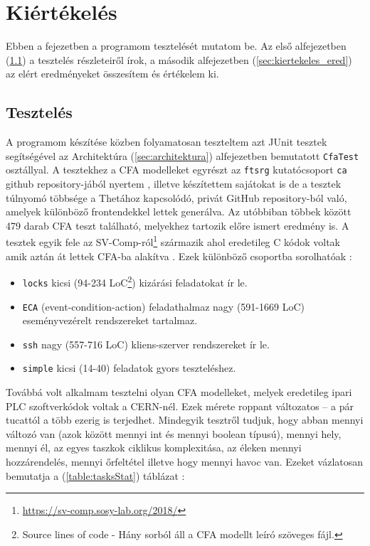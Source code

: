 \chapter{Kiértékelés}
\label{sec:kiertekeles}

Ebben a fejezetben a programom tesztelését mutatom be. Az első alfejezetben (\ref{sec:kiertekeles_teszt}) a tesztelés részleteiről írok, a második alfejezetben (\ref{sec:kiertekeles_ered}) az elért eredményeket összesítem és értékelem ki.

\section{Tesztelés}
\label{sec:kiertekeles_teszt}
A programom készítése közben folyamatosan teszteltem azt JUnit tesztek segítségével az Architektúra (\ref{sec:architektura}) alfejezetben bemutatott \texttt{CfaTest} osztállyal. A tesztekhez a CFA modelleket egyrészt az \texttt{ftsrg} kutatócsoport \texttt{ca} github repository-jából nyertem \cite{ca-lab-tests}, illetve készítettem sajátokat is de a tesztek túlnyomó többsége a Thetához kapcsolódó, privát GitHub repository-ból való, amelyek különböző frontendekkel lettek generálva. Az utóbbiban többek között 479 darab CFA teszt található, melyekhez tartozik előre ismert eredmény is. A tesztek egyik fele az SV-Comp-ról\footnote{\url{https://sv-comp.sosy-lab.org/2018/}} származik ahol eredetileg C kódok voltak amik aztán át lettek CFA-ba alakítva \cite{vpt2017}. Ezek különböző csoportba sorolhatóak \cite{akos-phd}:

\begin{itemize}
	\label{felsorolas}
	
	\item \texttt{locks} kicsi (94-234 LoC\footnote{Source lines of code - Hány sorból áll a CFA modellt leíró szöveges fájl.}) kizárási feladatokat ír le.
	
	\item \texttt{ECA} (event-condition-action) feladathalmaz nagy (591-1669 LoC) eseményvezérelt rendszereket tartalmaz.
	
	\item \texttt{ssh} nagy (557-716 LoC) kliens-szerver rendszereket ír le.
	
	\item \texttt{simple} kicsi (14-40) feladatok gyors teszteléshez.
\end{itemize}

Továbbá volt alkalmam tesztelni olyan CFA modelleket, melyek eredetileg ipari PLC szoftverkódok voltak a CERN-nél. \cite{darvas2019plcverif} Ezek mérete roppant változatos -- a pár tucattól a több ezerig is terjedhet. Mindegyik tesztről tudjuk, hogy abban mennyi változó van (azok között mennyi int és mennyi boolean típusú), mennyi hely, mennyi él, az egyes taszkok ciklikus komplexitása, az éleken mennyi hozzárendelés, mennyi őrfeltétel illetve hogy mennyi havoc van. Ezeket vázlatosan bemutatja a (\ref{table:tasksStat}) táblázat \cite{akos-phd}:

